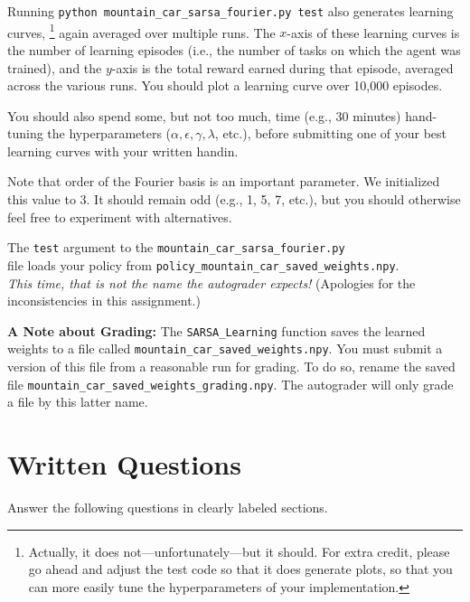 \documentclass{article}
\begin{document}
Running \texttt{python mountain\_car\_sarsa\_fourier.py test} also
generates learning curves,%
\footnote{Actually, it does not---unfortunately---but it should. For
  extra credit, please go ahead and adjust the test code so that it
  does generate plots, so that you can more easily tune the
  hyperparameters of your implementation.} again averaged over
multiple runs.  The $x$-axis of these learning curves is the number of
learning episodes (i.e., the number of tasks on which the agent was
trained), and the $y$-axis is the total reward earned during that
episode, averaged across the various runs.  You should plot a learning
curve over 10,000 episodes.

You should also spend some, but not too much, time (e.g., 30 minutes)
hand-tuning the hyperparameters ($\alpha, \epsilon, \gamma, \lambda$,
etc.), before submitting one of your best learning curves with your
written handin.

Note that order of the Fourier basis is an important parameter.  We
initialized this value to 3.  It should remain odd (e.g., 1, 5, 7,
etc.), but you should otherwise feel free to experiment with alternatives.

The \texttt{test} argument to the
\texttt{mountain\_car\_sarsa\_fourier.py} \\
file loads your policy from
\texttt{policy\_mountain\_car\_saved\_weights.npy}. \\
\emph{This time, that is not the name the autograder expects!}
(Apologies for the inconsistencies in this assignment.)

\vspace{2.5mm}

\textbf{A Note about Grading:}
The \texttt{SARSA\_Learning} function saves the learned weights to a
file called \texttt{mountain\_car\_saved\_weights.npy}.  You must
submit a version of this file from a reasonable run for grading.  To
do so, rename the saved file
\texttt{mountain\_car\_saved\_weights\_grading.npy}.  The autograder
will only grade a file by this latter name.


\section{Written Questions}
Answer the following questions in clearly labeled sections.
\end{document}
